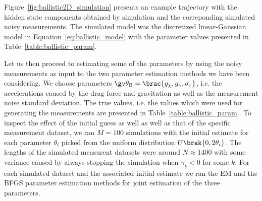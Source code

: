 Figure~\ref{fig:ballistic2D_simulation} presents an example trajectory with
the hidden state components obtained by simulation and the correponding
simulated noisy measurements. The simulated model was the discretized
linear-Gaussian model in Equation~\eqref{eq:ballistic_model} with  
the parameter values presented in Table~\ref{table:ballistic_param}.

\begin{table}[htbp]
\caption{Parameter values used for simulation in Section~\ref{sec:ballistic}}
\label{table:ballistic_param}
\centering
\footnotesize
{}
\end{table}

Let us then proceed to estimating some of the parameters by using the noisy
measurements as input to the two parameter estimation methods we have been considering.
We choose parameters $\Th_{\mathrm{B}}=\brac{g_\chi,g_\gamma,\sigma_r}$, i.e. the
accelerations caused by the drag force and gravitation as well as the measurement noise
standard deviation. The true values, i.e. the values which were used for generating the
measurements are presented in Table~\ref{table:ballistic_param}. To inspect the effect of
the initial guess as well as well as that of the specific measurement dataset, we ran
$M=100$ simulations with the initial estimate for each parameter $\theta_i$ picked 
from the uniform distribution $U\brak{0,2\theta_i}$. The lengths of the simulated measurent
datasets were around $N\approx 1400$ with some variance caused by always stopping
the simulation when $\gamma_k<0$ for some $k$. For each simulated dataset and the associated
initial estimate we ran the EM and the BFGS parameter estimation methods for joint estimation
of the three parameters. 

